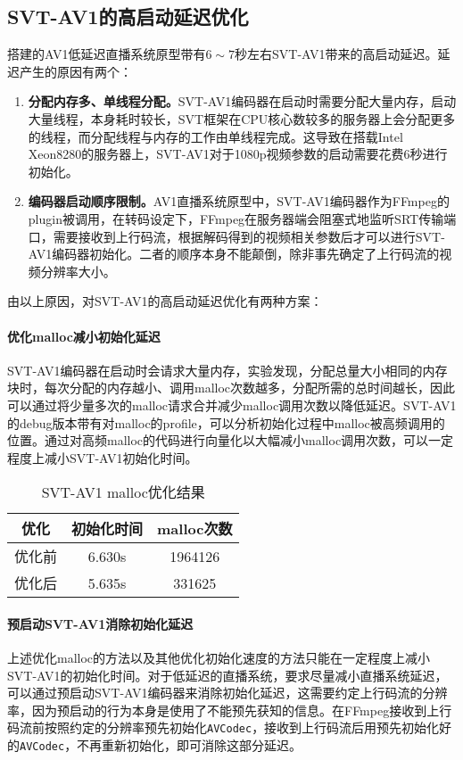 \subsection{SVT-AV1的高启动延迟优化}
  搭建的AV1低延迟直播系统原型带有$6\sim 7$秒左右SVT-AV1带来的高启动延迟。延迟产生的原因有两个：

  \begin{enumerate} [label=\arabic*)]
    \item \textbf{分配内存多、单线程分配。}SVT-AV1编码器在启动时需要分配大量内存，启动大量线程，本身耗时较长，SVT框架在CPU核心数较多的服务器上会分配更多的线程，而分配线程与内存的工作由单线程完成。这导致在搭载Intel Xeon8280的服务器上，SVT-AV1对于1080p视频参数的启动需要花费6秒进行初始化。
    \item \textbf{编码器启动顺序限制。}AV1直播系统原型中，SVT-AV1编码器作为FFmpeg的plugin被调用，在转码设定下，FFmpeg在服务器端会阻塞式地监听SRT传输端口，需要接收到上行码流，根据解码得到的视频相关参数后才可以进行SVT-AV1编码器初始化。二者的顺序本身不能颠倒，除非事先确定了上行码流的视频分辨率大小。
  \end{enumerate}

  由以上原因，对SVT-AV1的高启动延迟优化有两种方案：

  \paragraph{优化malloc减小初始化延迟} SVT-AV1编码器在启动时会请求大量内存，实验发现，分配总量大小相同的内存块时，每次分配的内存越小、调用malloc次数越多，分配所需的总时间越长，因此可以通过将少量多次的malloc请求合并减少malloc调用次数以降低延迟。SVT-AV1的debug版本带有对malloc的profile，可以分析初始化过程中malloc被高频调用的位置。通过对高频malloc的代码进行向量化以大幅减小malloc调用次数，可以一定程度上减小SVT-AV1初始化时间。

  \begin{table}[!hpt]
    \caption{SVT-AV1 malloc优化结果}
    \label{tab:malloc}
    \centering
    \begin{tabular}{ccc} \toprule
      优化    & 初始化时间 & malloc次数\\ \midrule
      优化前  & 6.630s   & 1964126  \\
      优化后  & 5.635s   & 331625   \\ \bottomrule
    \end{tabular}
  \end{table}

  \paragraph{预启动SVT-AV1消除初始化延迟} 上述优化malloc的方法以及其他优化初始化速度的方法只能在一定程度上减小SVT-AV1的初始化时间。对于低延迟的直播系统，要求尽量减小直播系统延迟，可以通过预启动SVT-AV1编码器来消除初始化延迟，这需要约定上行码流的分辨率，因为预启动的行为本身是使用了不能预先获知的信息。在FFmpeg接收到上行码流前按照约定的分辨率预先初始化\texttt{AVCodec}，接收到上行码流后用预先初始化好的\texttt{AVCodec}，不再重新初始化，即可消除这部分延迟。

